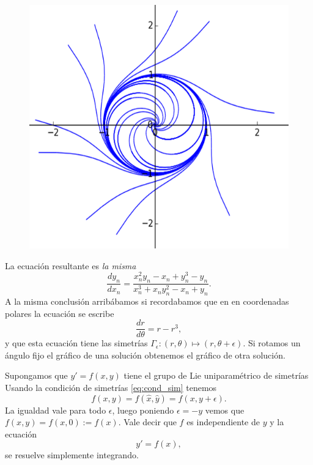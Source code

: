 \begin{figure}
 \includegraphics[scale=.4]{imagenes/sol_rotadas.png}
\end{figure}
La ecuación resultante es \emph{la misma}
\[\frac{dy_n}{dx_n}=\frac{x_{n}^{2} y_{n} - x_{n} + y_{n}^{3} - y_{n}}{x_{n}^{3} + x_{n} y_{n}^{2}
    - x_{n} + y_{n}}.\]
A la misma conclusión arribábamos si recordabamos que en en coordenadas polares la ecuación se escribe
\[\frac{dr}{d\theta}=r-r^3,\]
y que esta ecuación tiene las simetrías $\Gamma_{\epsilon}:(r,\theta)\mapsto (r,\theta+\epsilon)$. Si rotamos un ángulo fijo el gráfico de una solución obtenemos el gráfico de otra solución.








\begin{ejemplo}\label{ejem:tras} Supongamos que $y'=f(x,y)$ tiene  el grupo de Lie uniparamétrico de simetrías
Usando la condición de simetrías \eqref{eq:cond_sim} tenemos
\[f(x,y)=f(\hat{x},\hat{y})=f(x,y+\epsilon).\]
La igualdad vale para todo $\epsilon$, luego poniendo $\epsilon=-y$ vemos que $f(x,y)=f(x,0):=f(x)$. Vale decir que $f$ es independiente de $y$ y la ecuación
\[y'=f(x),\]
se resuelve simplemente integrando.
\end{ejemplo}



